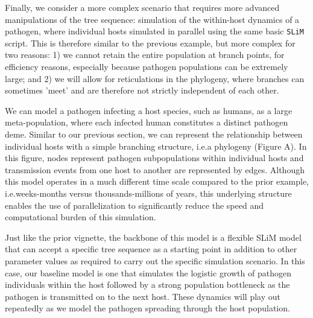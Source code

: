 \documentclass[12pt]{article}
\newcommand{\slim}[0]{\texttt{SLiM}\xspace}
\newcommand*{\ie}{i.e.\xcomma}
\begin{document}
Finally, we consider a more complex scenario that requires more advanced manipulations of the tree sequence:
simulation of the within-host dynamics of a pathogen,
where individual hosts simulated in parallel using the same basic \slim script.
This is therefore similar to the previous example, but more complex for two reasons:
1) we cannot retain the entire population at branch points, for efficiency reasons, especially because pathogen populations can be extremely large; and
2) we will allow for reticulations in the phylogeny, where branches can sometimes 'meet' and are therefore not strictly independent of each other.

We can model a pathogen infecting a host species, such as humans, as a large meta-population, where each infected human constitutes a distinct pathogen deme.
Similar to our previous section, we can represent the relationship between individual hosts with a simple branching structure, \ie a phylogeny (Figure A).
In %
this figure, nodes represent pathogen subpopulations within individual hosts and transmission events from one host to another are represented by edges.
Although this model operates in a much different time scale compared to the prior example,
\ie weeks-months versus thousands-millions of years, this underlying structure enables the use of parallelization
to significantly reduce the speed and computational burden of this simulation.

Just like the prior vignette, the backbone of this model is a flexible SLiM model that can accept a specific tree sequence as a starting point in addition to other
parameter values as required to carry out the specific simulation scenario. In this case, our baseline model is one that simulates the logistic growth of pathogen individuals
within the host followed by a strong population bottleneck as the pathogen is transmitted on to the next host. These dynamics will play out repeatedly as we model the pathogen
spreading through the host population.
\end{document}
